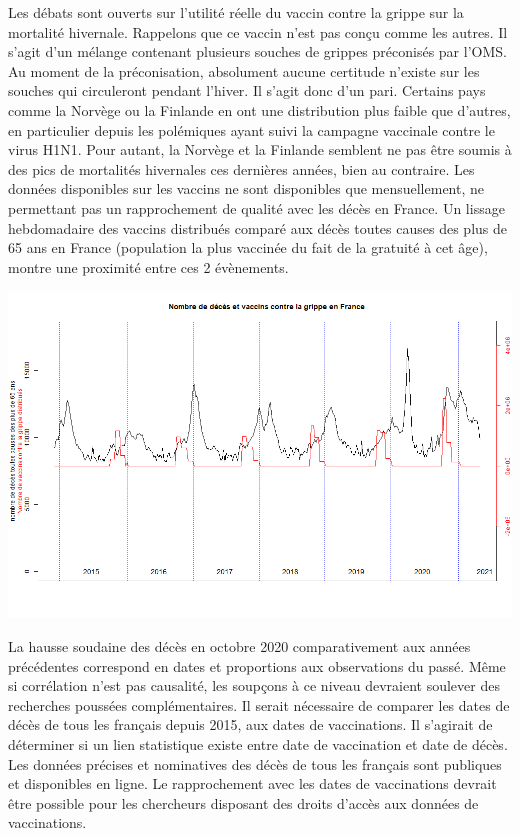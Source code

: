 \documentclass[
]{article}
\begin{document}
Les débats sont ouverts sur l'utilité réelle du vaccin contre la grippe
sur la mortalité hivernale. Rappelons que ce vaccin n'est pas conçu
comme les autres. Il s'agit d'un mélange contenant plusieurs souches de
grippes préconisés par l'OMS. Au moment de la préconisation, absolument
aucune certitude n'existe sur les souches qui circuleront pendant
l'hiver. Il s'agit donc d'un pari. Certains pays comme la Norvège ou la
Finlande en ont une distribution plus faible que d'autres, en
particulier depuis les polémiques ayant suivi la campagne vaccinale
contre le virus H1N1. Pour autant, la Norvège et la Finlande semblent ne
pas être soumis à des pics de mortalités hivernales ces dernières
années, bien au contraire. Les données disponibles sur les vaccins ne
sont disponibles que mensuellement, ne permettant pas un rapprochement
de qualité avec les décès en France. Un lissage hebdomadaire des vaccins
distribués comparé aux décès toutes causes des plus de 65 ans en France
(population la plus vaccinée du fait de la gratuité à cet âge), montre
une proximité entre ces 2 évènements.

\includegraphics[width=10.41667in,height=\textheight]{data/images/Lien_Deces_Vaccin_Grippe.png}

La hausse soudaine des décès en octobre 2020 comparativement aux années
précédentes correspond en dates et proportions aux observations du
passé. Même si corrélation n'est pas causalité, les soupçons à ce niveau
devraient soulever des recherches poussées complémentaires. Il serait
nécessaire de comparer les dates de décès de tous les français depuis
2015, aux dates de vaccinations. Il s'agirait de déterminer si un lien
statistique existe entre date de vaccination et date de décès. Les
données précises et nominatives des décès de tous les français sont
publiques et disponibles en ligne. Le rapprochement avec les dates de
vaccinations devrait être possible pour les chercheurs disposant des
droits d'accès aux données de vaccinations.
\end{document}
